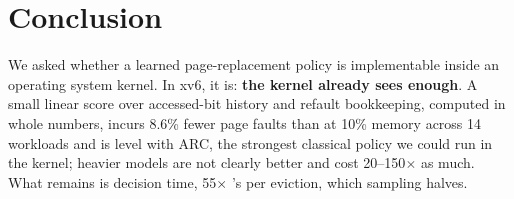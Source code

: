 \section{Conclusion}
\label{sec:conclusion}

We asked whether a learned page-replacement policy is implementable inside an operating
system kernel. In xv6, it is: \textbf{the kernel already sees enough}. A small linear
score over accessed-bit history and refault bookkeeping, computed in whole numbers,
incurs 8.6\% fewer page faults than \clock at 10\% memory across 14 workloads and is level
with ARC, the strongest classical policy we could run in the kernel; heavier models are
not clearly better and cost 20--150$\times$ as much. What remains is decision time,
55$\times$ \clock's per eviction, which sampling halves. 
